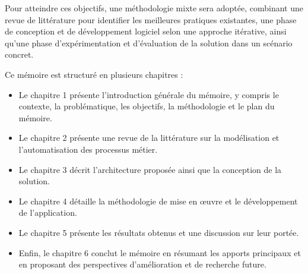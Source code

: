 Pour atteindre ces objectifs, une méthodologie mixte sera adoptée, combinant une revue de littérature pour identifier les meilleures pratiques existantes, une phase de conception et de développement logiciel selon une approche itérative, ainsi qu’une phase d’expérimentation et d’évaluation de la solution dans un scénario concret.

Ce mémoire est structuré en plusieurs chapitres :
\begin{itemize}
    \item Le chapitre 1 présente l’introduction générale du mémoire, y compris le contexte, la problématique, les objectifs, la méthodologie et le plan du mémoire.
    \item Le chapitre 2 présente une revue de la littérature sur la modélisation et l’automatisation des processus métier.
    \item Le chapitre 3 décrit l’architecture proposée ainsi que la conception de la solution.
    \item Le chapitre 4 détaille la méthodologie de mise en œuvre et le développement de l’application.
    \item Le chapitre 5 présente les résultats obtenus et une discussion sur leur portée.
    \item Enfin, le chapitre 6 conclut le mémoire en résumant les apports principaux et en proposant des perspectives d’amélioration et de recherche future.
\end{itemize}
